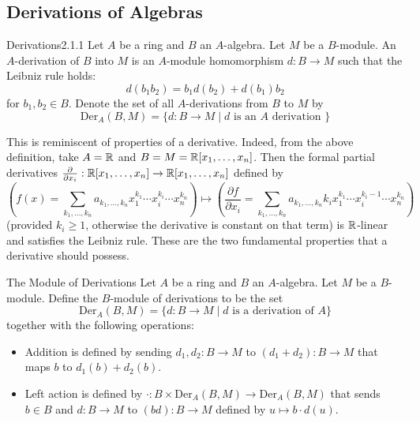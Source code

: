 \documentclass[a4paper]{article}
\begin{document}
\subsection{Derivations of Algebras}
\begin{defn}{Derivations}{2.1.1} Let $A$ be a ring and $B$ an $A$-algebra. Let $M$ be a $B$-module. An $A$-derivation of $B$ into $M$ is an $A$-module homomorphism $d:B\to M$ such that the Leibniz rule holds: $$d(b_1b_2)=b_1d(b_2)+d(b_1)b_2$$ for $b_1,b_2\in B$. Denote the set of all $A$-derivations from $B$ to $M$ by $$\text{Der}_A(B,M)=\{d:B\to M\;|\;d\text{ is an }A\text{ derivation }\}$$
\end{defn}

This is reminiscent of properties of a derivative. Indeed, from the above definition, take $A=\mathbb{R}$ and $B=M=\mathbb{R}[x_1,\dots,x_n]$. Then the formal partial derivatives $\frac{\partial}{\partial x_i}:\mathbb{R}[x_1,\dots,x_n]\to\mathbb{R}[x_1,\dots,x_n]$ defined by $$\left(f(x)=\sum_{k_1,\dots,k_n}a_{k_1,\dots,k_n}x_1^{k_1}\cdots x_i^{k_i}\cdots x_n^{k_n}\right)\mapsto\left(\frac{\partial f}{\partial x_i}=\sum_{k_1,\dots,k_n}a_{k_1,\dots,k_n}k_ix_1^{k_1}\cdots x_i^{k_i-1}\cdots x_n^{k_n}\right)$$ (provided $k_i\geq 1$, otherwise the derivative is constant on that term) is $\mathbb{R}$-linear and satisfies the Leibniz rule. These are the two fundamental properties that a derivative should possess. 

\begin{defn}{The Module of Derivations}{} Let $A$ be a ring and $B$ an $A$-algebra. Let $M$ be a $B$-module. Define the $B$-module of derivations to be the set $$\text{Der}_A(B,M)=\{d:B\to M\;|\;d\text{ is a derivation of }A\}$$ together with the following operations: 
\begin{itemize}
\item Addition is defined by sending $d_1,d_2:B\to M$ to $(d_1+d_2):B\to M$ that maps $b$ to $d_1(b)+d_2(b)$. 
\item Left action is defined by $\cdot:B\times\text{Der}_A(B,M)\to\text{Der}_A(B,M)$ that sends $b\in B$ and $d:B\to M$ to $(bd):B\to M$ defined by $u\mapsto b\cdot d(u)$.
\end{itemize}
\end{defn}
\end{document}
